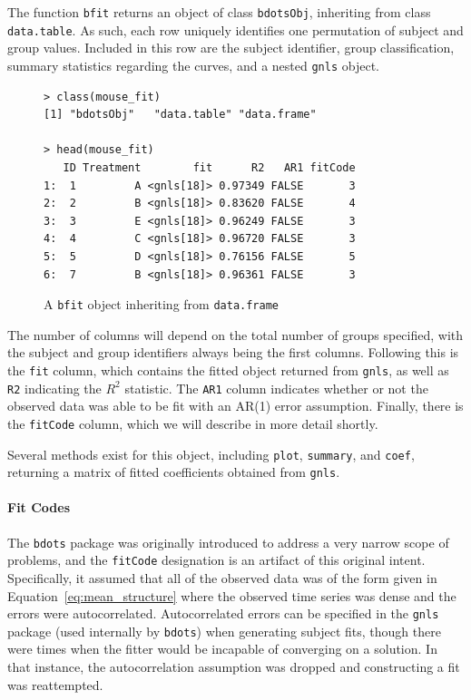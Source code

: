 \documentclass{article}
\newcommand{\xt}{\texttt}%
\begin{document}
The function \texttt{bfit} returns an object of class \texttt{bdotsObj}, inheriting from class \texttt{data.table}. As such, each row uniquely identifies one permutation of subject and group values. Included in this row are the subject identifier, group classification, summary statistics regarding the curves, and a nested \xt{gnls} object. 

\begin{singlespace}
\begin{figure}[H]
\centering
\begin{BVerbatim}
> class(mouse_fit)
[1] "bdotsObj"   "data.table" "data.frame"

> head(mouse_fit)
   ID Treatment        fit      R2   AR1 fitCode
1:  1         A <gnls[18]> 0.97349 FALSE       3
2:  2         B <gnls[18]> 0.83620 FALSE       4
3:  3         E <gnls[18]> 0.96249 FALSE       3
4:  4         C <gnls[18]> 0.96720 FALSE       3
5:  5         D <gnls[18]> 0.76156 FALSE       5
6:  7         B <gnls[18]> 0.96361 FALSE       3
\end{BVerbatim}
\caption{A \xt{bfit} object inheriting from \xt{data.frame}}
\label{fig:bdotsObj}
\end{figure}
\end{singlespace}

The number of columns will depend on the total number of groups specified, with the subject and group identifiers always being the first columns. Following this is the \xt{fit} column, which contains the fitted object returned from \xt{gnls}, as well as \xt{R2} indicating the $R^2$ statistic. The \xt{AR1} column indicates whether or not the observed data was able to be fit with an AR(1) error assumption. Finally, there is the \xt{fitCode} column, which we will describe in more detail shortly.

Several methods exist for this object, including \texttt{plot}, \texttt{summary}, and \texttt{coef}, returning a matrix of fitted coefficients obtained from \texttt{gnls}. 


\paragraph{Fit Codes}

The \xt{bdots} package was originally introduced to address a very narrow scope of problems, and the \xt{fitCode} designation is an artifact of this original intent. Specifically, it assumed that all of the observed data was of the form given in Equation~\ref{eq:mean_structure} where the observed time series was dense and the errors were autocorrelated. Autocorrelated errors can be specified in the \xt{gnls} package (used internally by \xt{bdots}) when generating subject fits, though there were times when the fitter would be incapable of converging on  a solution. In that instance, the autocorrelation assumption was dropped and constructing a fit was reattempted.
\end{document}
